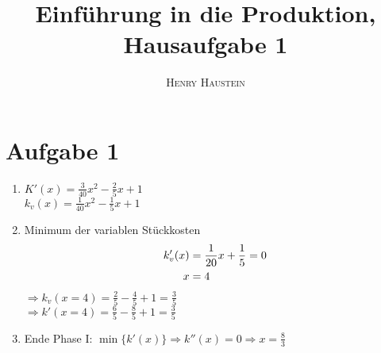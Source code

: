 \documentclass{article}
\title{\textbf{Einführung in die Produktion, Hausaufgabe 1}}
\author{\textsc{Henry Haustein}}
\date{}
\begin{document}
	\maketitle
	
	\section*{Aufgabe 1}
	\begin{enumerate}[label=(\alph*)]
		\item $K'(x) = \frac{3}{40}x^2 - \frac{2}{5}x + 1$ \\
		$k_v(x) = \frac{1}{40}x^2 - \frac{1}{5}x + 1$
		\item Minimum der variablen Stückkosten
		\begin{align}
			k'_v(x) &= \frac{1}{20}x + \frac{1}{5} =0 \notag \\
			x &= 4 \notag
		\end{align}
		$\Rightarrow k_v(x=4) = \frac{2}{5} - \frac{4}{5} + 1 = \frac{3}{5}$ \\
		$\Rightarrow k'(x=4) = \frac{6}{5} - \frac{8}{5} + 1 = \frac{3}{5}$
		\item Ende Phase I: $\min\{k'(x)\} \Rightarrow k''(x)=0\Rightarrow x=\frac{8}{3}$
	\end{enumerate}
	
\end{document}
